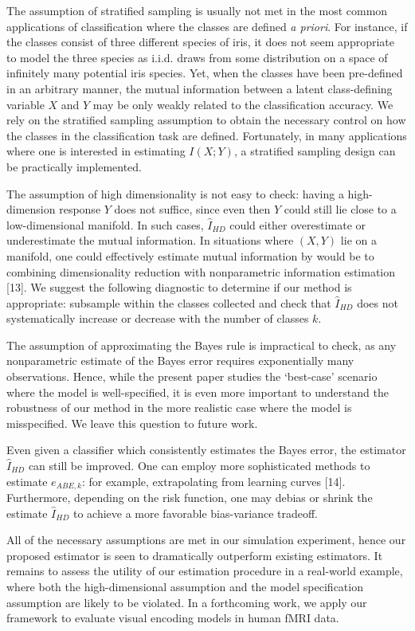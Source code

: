 \documentclass{article}
\begin{document}
The assumption of stratified sampling is usually not met in the most common applications of classification
where the classes are defined \emph{a priori}.  For instance, if the classes consist of three different species of iris,
it does not seem appropriate to model the three species as i.i.d. draws from some distribution on a space of infinitely many
potential iris species.  Yet, when the classes have been pre-defined in an arbitrary manner,
the mutual information between a latent class-defining variable $X$ and $Y$ may be only weakly related to the classification
accuracy.  We rely on the stratified sampling assumption to obtain the necessary control on how the classes
in the classification task are defined.  Fortunately, in many applications where one is interested in estimating $I(X; Y)$,
a stratified sampling design can be practically implemented.

The assumption of high dimensionality is not easy to check:
having a high-dimension response $Y$ does not suffice, since even then $Y$ could still
lie close to a low-dimensional manifold.  In such cases, $\hat{I}_{HD}$ could either overestimate or underestimate the mutual information.
In situations where $(X, Y)$ lie on a manifold, one
  could effectively estimate mutual information by would be to
  combining dimensionality reduction with nonparametric information
  estimation [13]. 
  We suggest the following diagnostic to determine if our method is appropriate: subsample within the classes collected
and check that $\hat{I}_{HD}$ does not systematically increase or decrease with the number of classes $k$.

The assumption of approximating the Bayes rule is impractical to check, 
as any nonparametric estimate of the Bayes error requires exponentially many observations.
Hence, while the present paper studies the `best-case' scenario where the model is well-specified,
it is even more important to understand the robustness of our method in the more realistic case
where the model is misspecified.  We leave this question to future work.

Even given a classifier which consistently estimates the Bayes error,
the estimator $\hat{I}_{HD}$ can still be improved.  One can employ more
sophisticated methods to estimate $e_{ABE, k}$: for example,
extrapolating from learning curves [14].  Furthermore,
depending on the risk function, one may debias or shrink the estimate
$\hat{I}_{HD}$ to achieve a more favorable bias-variance tradeoff.

All of the necessary assumptions are met in our simulation experiment, 
hence our proposed estimator is seen to dramatically outperform existing estimators. It remains to assess the utility
of our estimation procedure in a real-world example, where both the high-dimensional assumption and the model specification assumption are likely to be violated.  In a forthcoming
work, we apply our framework to evaluate visual encoding models in
human fMRI data.
\end{document}
